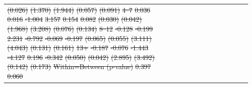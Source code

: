 \documentclass[12pt,english]{article}
\providecommand{\DIFdeltex}[1]{{\protect\color{red}\sout{#1}}}                      %
\providecommand{\DIFdelFL}[1]{\DIFdel{#1}} %
\providecommand{\DIFdel}[1]{\texorpdfstring{\DIFdeltex{#1}}{}} %
\begin{document}
\begin{table}[!ht]
\begin{center}
\begin{adjustbox}{max width=.9\linewidth}
\begin{threeparttable}
{\begin{tabular}{l*{6}{S S}}
\DIFdelFL{(0.026)         }%
\DIFdelFL{(1.370)         }%
\DIFdelFL{(1.944)         }%
\DIFdelFL{(0.057)         }%
\DIFdelFL{(0.091)         }%
\DIFdelFL{4--7}%
\DIFdelFL{0.036         }%
\DIFdelFL{0.016         }%
\DIFdelFL{-1.004         }%
\DIFdelFL{3.157         }%
\DIFdelFL{0.154}%
\DIFdelFL{0.082         }%
\DIFdelFL{(0.030)         }%
\DIFdelFL{(0.042)         }%
\DIFdelFL{(1.968)         }%
\DIFdelFL{(3.208)         }%
\DIFdelFL{(0.076)         }%
\DIFdelFL{(0.134)         }%
\DIFdelFL{8--12}%
\DIFdelFL{-0.128}%
\DIFdelFL{-0.199}%
\DIFdelFL{2.231         }%
\DIFdelFL{-0.792         }%
\DIFdelFL{-0.069         }%
\DIFdelFL{-0.197         }%
\DIFdelFL{(0.065)         }%
\DIFdelFL{(0.055)         }%
\DIFdelFL{(3.111)         }%
\DIFdelFL{(4.043)         }%
\DIFdelFL{(0.131)         }%
\DIFdelFL{(0.161)         }%
\DIFdelFL{13+}%
\DIFdelFL{-0.187}%
\DIFdelFL{-0.076}%
\DIFdelFL{-1.443         }%
\DIFdelFL{-4.127         }%
\DIFdelFL{0.196         }%
\DIFdelFL{-0.342}%
\DIFdelFL{(0.050)         }%
\DIFdelFL{(0.042)         }%
\DIFdelFL{(2.895)         }%
\DIFdelFL{(3.492)         }%
\DIFdelFL{(0.142)         }%
\DIFdelFL{(0.173)         }%
\DIFdelFL{Within=Between (p-value)}%
\DIFdelFL{0.397         }%
\DIFdelFL{0.060         }%

\end{tabular}}
\end{threeparttable}
\end{adjustbox}
\end{center}
\end{table}
\end{document}
